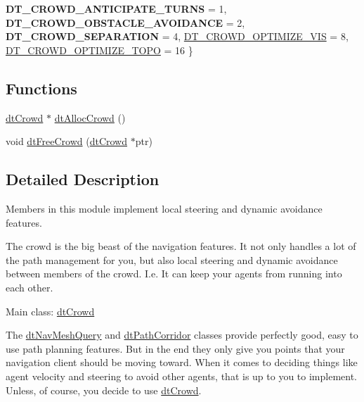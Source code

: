 \begin{DoxyCompactItemize}
{\bfseries D\+T\+\_\+\+C\+R\+O\+W\+D\+\_\+\+A\+N\+T\+I\+C\+I\+P\+A\+T\+E\+\_\+\+T\+U\+R\+NS} = 1, 
{\bfseries D\+T\+\_\+\+C\+R\+O\+W\+D\+\_\+\+O\+B\+S\+T\+A\+C\+L\+E\+\_\+\+A\+V\+O\+I\+D\+A\+N\+CE} = 2, 
{\bfseries D\+T\+\_\+\+C\+R\+O\+W\+D\+\_\+\+S\+E\+P\+A\+R\+A\+T\+I\+ON} = 4, 
\newline
\hyperlink{group__crowd_ggaa94b67d2fdcc390690c523f28019e52fad11f447facf1bf42c09de64e9483f3aa}{D\+T\+\_\+\+C\+R\+O\+W\+D\+\_\+\+O\+P\+T\+I\+M\+I\+Z\+E\+\_\+\+V\+IS} = 8, 
\hyperlink{group__crowd_ggaa94b67d2fdcc390690c523f28019e52fa89c6f7f2e49254e775cb2b85259a0a93}{D\+T\+\_\+\+C\+R\+O\+W\+D\+\_\+\+O\+P\+T\+I\+M\+I\+Z\+E\+\_\+\+T\+O\+PO} = 16
 \}
\end{DoxyCompactItemize}
\subsection*{Functions}
\begin{DoxyCompactItemize}
\item 
\hyperlink{classdtCrowd}{dt\+Crowd} $\ast$ \hyperlink{group__crowd_ga01a53c9d76d1b61678ab1944dfbfac55}{dt\+Alloc\+Crowd} ()
\item 
void \hyperlink{group__crowd_ga9475313642645070e78c359e0fc02b7a}{dt\+Free\+Crowd} (\hyperlink{classdtCrowd}{dt\+Crowd} $\ast$ptr)
\end{DoxyCompactItemize}


\subsection{Detailed Description}
Members in this module implement local steering and dynamic avoidance features.

The crowd is the big beast of the navigation features. It not only handles a lot of the path management for you, but also local steering and dynamic avoidance between members of the crowd. I.\+e. It can keep your agents from running into each other.

Main class\+: \hyperlink{classdtCrowd}{dt\+Crowd}

The \hyperlink{classdtNavMeshQuery}{dt\+Nav\+Mesh\+Query} and \hyperlink{classdtPathCorridor}{dt\+Path\+Corridor} classes provide perfectly good, easy to use path planning features. But in the end they only give you points that your navigation client should be moving toward. When it comes to deciding things like agent velocity and steering to avoid other agents, that is up to you to implement. Unless, of course, you decide to use \hyperlink{classdtCrowd}{dt\+Crowd}.

